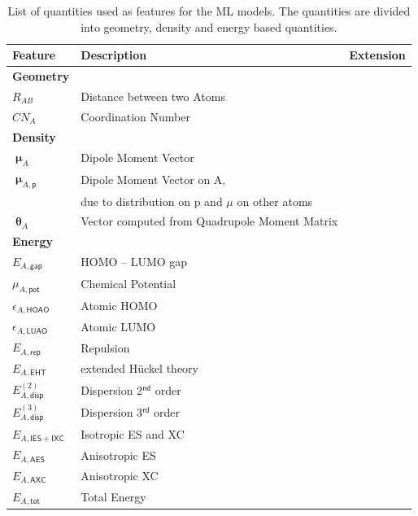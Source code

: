 \begin{table}[H]
	\centering
	\caption[List of quantities used as features for the ML model.]{List of quantities used as features for the ML models.
			The quantities are divided into geometry,
			density and energy based quantities.}
		\begin{tabular}{l l l}
			\hline
			Feature &  Description& Extension\\
			\hline
			\textbf{Geometry} & & \\
			$R_{AB}$ & Distance between two Atoms &  \\

			$CN_A$ & Coordination Number & \checkmark \\
			\hline

			\textbf{Density} && \\
			$\bm{\upmu}_{A}$ & Dipole Moment Vector & \checkmark \\
			$\bm{\upmu}_{A,\mathsf{p}}$ & Dipole Moment Vector on A, & \\
			 &  due to distribution on p and $\mu$ on other atoms & \\
			$\bm{\uptheta}_{A}$ & Vector computed from Quadrupole Moment Matrix & \checkmark\\
			\hline
			\textbf{Energy} && \\
			$E_{A,\mathsf{gap}}$ & HOMO -- LUMO gap& \checkmark\\

			$\mu_{A,\mathsf{pot}}$& Chemical Potential & \checkmark\\

			$\epsilon_{A,\mathsf{HOAO}}$ & Atomic HOMO & \checkmark \\

			$\epsilon_{A,\mathsf{LUAO}}$ & Atomic LUMO & \checkmark \\

			$E_{A,\mathsf{rep}}$ & Repulsion & \\
			$E_{A,\mathsf{EHT}}$ & extended Hückel theory& \\
			$E_{A,\mathsf{disp}}^{(2)}$ & Dispersion 2$^\mathsf{nd}$ order & \\
			$E_{A,\mathsf{disp}}^{(3)}$ & Dispersion 3$^\mathsf{rd}$ order & \\
			$E_{A,\mathsf{IES+IXC}}$ & Isotropic ES and XC & \\
			$E_{A,\mathsf{AES}}$ & Anisotropic ES& \\
			$E_{A,\mathsf{AXC}}$ & Anisotropic XC & \\
			$E_{A,\mathsf{tot}}$ & Total Energy & \\
			\hline 
		\end{tabular}
	\label{tab:Feature}
\end{table}

